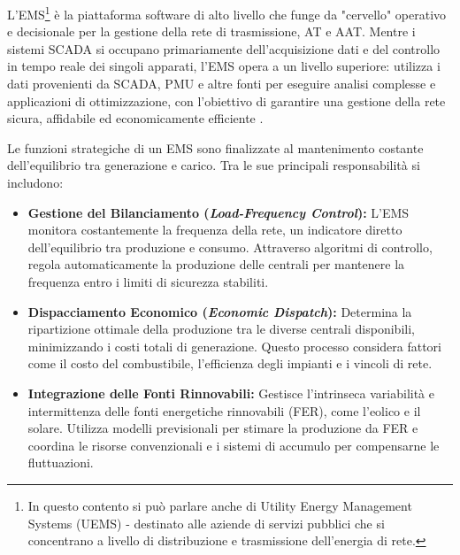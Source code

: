 





L'EMS\footnote{In questo contento si può parlare anche di Utility Energy Management Systems (UEMS) - destinato alle aziende di servizi pubblici che si concentrano a livello di distribuzione e trasmissione dell'energia di rete.} è la piattaforma software di alto livello che funge da "cervello" operativo e decisionale per la gestione della rete di trasmissione, AT e AAT. Mentre i sistemi SCADA si occupano primariamente dell'acquisizione dati e del controllo in tempo reale dei singoli apparati, l'EMS opera a un livello superiore: utilizza i dati provenienti da SCADA, PMU e altre fonti per eseguire analisi complesse e applicazioni di ottimizzazione, con l'obiettivo di garantire una gestione della rete sicura, affidabile ed economicamente efficiente \cite{enelx-EMS, EMS-GE}.

Le funzioni strategiche di un EMS sono finalizzate al mantenimento costante dell'equilibrio tra generazione e carico. Tra le sue principali responsabilità si includono:


\begin{itemize}
    \item \textbf{Gestione del Bilanciamento (\textit{Load-Frequency Control}):} L'EMS monitora costantemente la frequenza della rete, un indicatore diretto dell'equilibrio tra produzione e consumo. Attraverso algoritmi di controllo, regola automaticamente la produzione delle centrali per mantenere la frequenza entro i limiti di sicurezza stabiliti.
    \item \textbf{Dispacciamento Economico (\textit{Economic Dispatch}):} Determina la ripartizione ottimale della produzione tra le diverse centrali disponibili, minimizzando i costi totali di generazione. Questo processo considera fattori come il costo del combustibile, l'efficienza degli impianti e i vincoli di rete.
    \item \textbf{Integrazione delle Fonti Rinnovabili:} Gestisce l'intrinseca variabilità e intermittenza delle fonti energetiche rinnovabili (FER), come l'eolico e il solare. Utilizza modelli previsionali per stimare la produzione da FER e coordina le risorse convenzionali e i sistemi di accumulo per compensarne le fluttuazioni.
\end{itemize}

